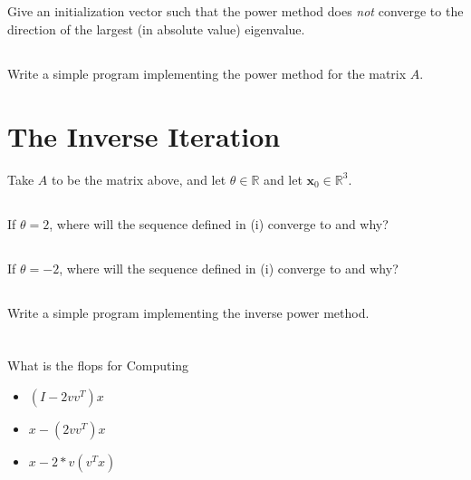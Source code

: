 \documentclass{article}%
\begin{document}
\subsection{}
Give an initialization vector such that the power method does \emph{not} converge to the direction of the largest (in absolute value) eigenvalue.
  
\subsection{}\label{sec:1d}
Write a simple program implementing the power method for the matrix $A$.


\section{The Inverse Iteration}
Take $A$ to be the matrix above, and let $\theta\in\mathbb{R}$ and let ${\boldsymbol x_0}\in\mathbb{R}^3$.

\subsection{}
If $\theta=2$, where will the sequence defined in (i)
  converge to and why?

\subsection{}
If $\theta=-2$, where will the sequence defined in (i)
  converge to and why?

\subsection{}
Write a simple program implementing the inverse power method.

\section{}
What is the flops for Computing

\begin{itemize}
  \item $(I-2vv^T)x$
  \item $x-(2vv^T)x$
  \item $x-2*v(v^Tx)$
\end{itemize}
\end{document}
